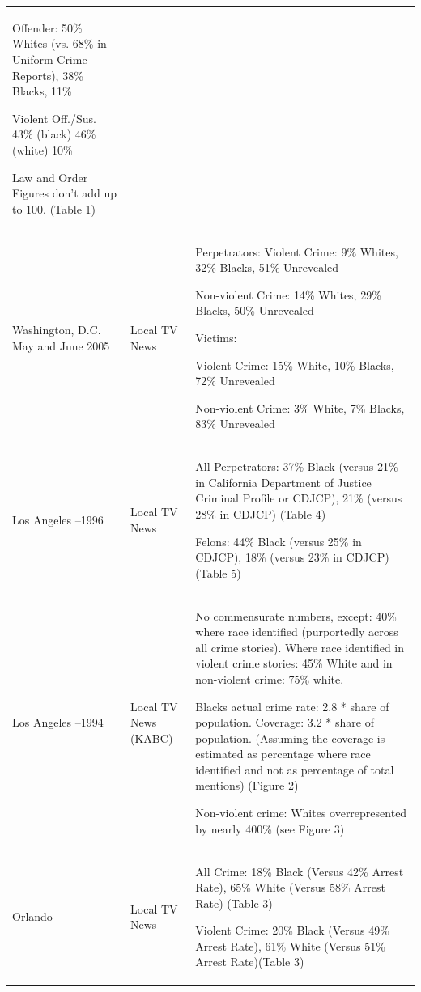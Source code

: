 \begin{longtable}{@{}>{\raggedright\arraybackslash}p{.23\linewidth}>{\raggedright\arraybackslash}p{.15\linewidth}>{\raggedright\arraybackslash}p{.56\linewidth}@{}}
Offender:  50\% Whites (vs. 68\% in Uniform Crime Reports),  38\% Blacks, 11\%

Violent Off./Sus. 43\% (black) 46\% (white) 10\%

Law and Order Figures don't add up to 100. (Table 1) \\
\citet{gross2006covering} \newline Washington, D.C. \newline May and June 2005 & Local TV News & Perpetrators:
Violent Crime: 9\% Whites, 32\% Blacks, 51\% Unrevealed

Non-violent Crime: 14\% Whites, 29\% Blacks, 50\% Unrevealed

Victims:

Violent Crime: 15\% White,  10\% Blacks, 72\% Unrevealed

Non-violent Crime: 3\% White,  7\% Blacks, 83\% Unrevealed \\
\citet{dixon2000overrepresentation} \newline Los Angeles \newline 1995--1996 & Local TV News & All Perpetrators: 37\% Black (versus 21\% in California Department of Justice Criminal Profile or CDJCP), 21\% (versus 28\% in CDJCP) (Table 4)

Felons: 44\% Black (versus 25\% in CDJCP), 18\% (versus 23\% in CDJCP) (Table 5) \\
\citet{gilliam1996crime} \newline Los Angeles \newline 1993--1994 & Local TV News (KABC) & No commensurate numbers, except: 40\% where race identified (purportedly across all crime stories). Where race identified in violent crime stories: 45\% White and in non-violent crime: 75\% white.

Blacks actual crime rate: 2.8 * share of population. Coverage: 3.2 * share of population. (Assuming the coverage is estimated as percentage where race identified and not as percentage of total mentions) (Figure 2)

Non-violent crime: Whites overrepresented by nearly 400\% (see Figure 3) \\
\citet{chiricos2002racial} \newline Orlando \newline 1998 & Local TV News & All Crime: 18\% Black (Versus 42\% Arrest Rate),  65\% White (Versus 58\% Arrest Rate) (Table  3)

Violent Crime: 20\% Black (Versus 49\% Arrest Rate), 61\% White (Versus 51\% Arrest Rate)(Table  3) \\
\end{longtable}
\endgroup

